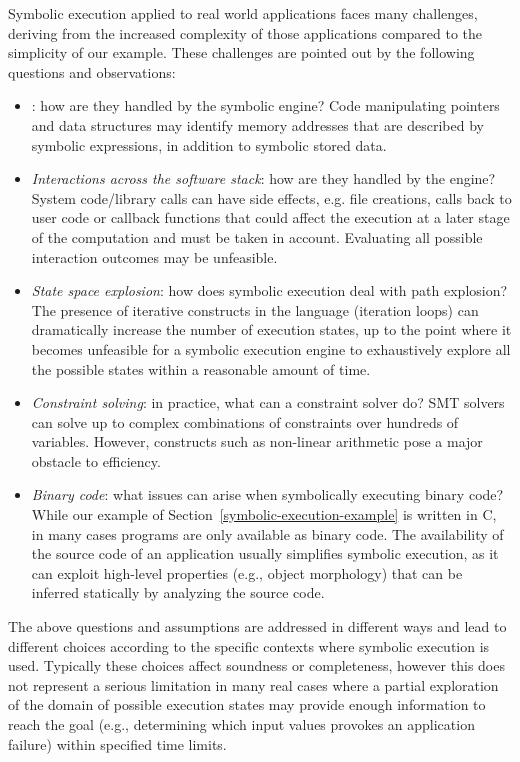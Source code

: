 Symbolic execution applied to real world applications faces many challenges, deriving from the increased complexity of those applications compared to the simplicity of our example. These challenges are pointed out by the following questions and observations:

\begin{itemize}
	\item {}: how are they handled by the symbolic engine? Code manipulating pointers and data structures may identify memory addresses that are described by symbolic expressions, in addition to symbolic stored data.
	\item {\em Interactions across the software stack}: how are they handled by the engine? System code/library calls can have side effects, e.g. file creations, calls back to user code or callback functions that could affect the execution at a later stage of the computation and must be taken in account. 
	Evaluating all possible interaction outcomes may be unfeasible.
	\item {\em State space explosion}: how does symbolic execution deal with path explosion? The presence of iterative constructs in the language (iteration loops) can dramatically increase the number of execution states, up to the point where it becomes unfeasible for a symbolic execution engine to exhaustively explore all the possible states within a reasonable amount of time. 
	\item {\em Constraint solving}: in practice, what can a constraint solver do?
	SMT solvers can solve up to complex combinations of constraints over hundreds of variables. However, constructs such as non-linear arithmetic pose a major obstacle to efficiency.
	\item {\em Binary code}: what issues can arise when symbolically executing binary code?
	While our example of Section~\ref{symbolic-execution-example} is written in C, in many cases programs are only available as binary code. The availability of the source code of an application usually simplifies symbolic execution, as it can exploit high-level properties (e.g., object morphology) that can be inferred statically by analyzing the source code.
\end{itemize}

\noindent The above questions and assumptions are addressed in different ways and lead to different choices according to the specific contexts where symbolic execution is used. Typically these choices affect soundness or completeness, however this does not represent a serious limitation in many real cases where a partial exploration of the domain of possible execution states may provide enough information to reach the goal (e.g., determining which input values provokes an application failure) within specified time limits.

